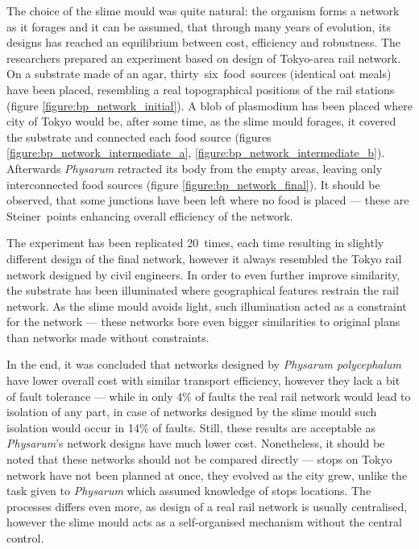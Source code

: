 The choice of the slime mould was quite natural: the organism forms a network as it forages and it can be assumed, that through many years of evolution, its designs has reached an equilibrium between cost, efficiency and robustness. The researchers prepared an experiment based on design of Tokyo-area rail network. On a substrate made of an agar, thirty~six~food~sources (identical oat meals) have been placed, resembling a real topographical positions of the rail stations (figure \ref{figure:bp_network_initial}). A blob of plasmodium has been placed where city of Tokyo would be, after some time, as the slime mould forages, it covered the substrate and connected each food source (figures \ref{figure:bp_network_intermediate_a}, \ref{figure:bp_network_intermediate_b}). Afterwards \textit{Physarum} retracted its body from the empty areas, leaving only interconnected food sources (figure \ref{figure:bp_network_final}). It should be observed, that some junctions have been left where no food is placed --- these are Steiner~points \cite{kou1981fast} enhancing overall efficiency of the network.

The experiment has been replicated 20~times, each time resulting in slightly different design of the final network, however it always resembled the Tokyo rail network designed by civil engineers. In order to even further improve similarity, the substrate has been illuminated where geographical features restrain the rail network. As the slime mould avoids light, such illumination acted as a constraint for the network --- these networks bore even bigger similarities to original plans than networks made without constraints. 

In the end, it was concluded that networks designed by \textit{Physarum polycephalum} have lower overall cost with similar transport efficiency, however they lack a bit of fault tolerance --- while in only 4\% of faults the real rail network would lead to isolation of any part, in case of networks designed by the slime mould such isolation would occur in 14\% of faults. Still, these results are acceptable as \textit{Physarum}'s network designs have much lower cost. Nonetheless, it should be noted that these networks should not be compared directly --- stops on Tokyo network have not been planned at once, they evolved as the city grew, unlike the task given to \textit{Physarum} which assumed knowledge of stops locations. The processes differs even more, as design of a real rail network is usually centralised, however the slime mould acts as a self-organised mechanism without the central control.


